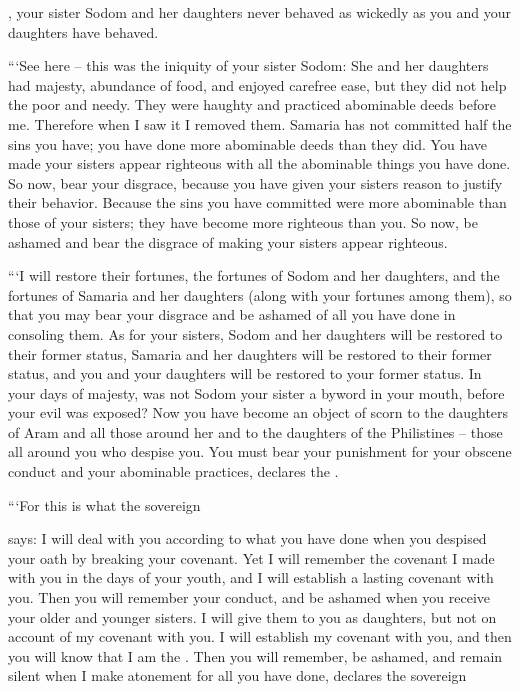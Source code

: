 {{}, your sister
Sodom
and her daughters
never behaved
as
wickedly as you
and your daughters
have
behaved.
\par }{\PP {}“‘See here – this was the iniquity of your sister Sodom: She and her daughters had majesty, abundance of food, and enjoyed carefree ease, but they did not help the poor and needy.
They were haughty
and practiced
abominable deeds
before
me. Therefore when I saw
it I removed them.
Samaria
has not
committed
half
the sins
you have; you have done more
abominable deeds
than they did. You have made your sisters
appear righteous
with all
the abominable things
you have
done.
So now,
bear
your disgrace,
because you
have
given your sisters
reason
to justify
their behavior. Because
the sins
you have committed were more abominable than
those of your sisters; they have become more
righteous than
you.
So
now, be ashamed
and bear
the disgrace
of making your sisters
appear righteous.
\par }{\PP {}“‘I will restore
their fortunes,
the fortunes
of Sodom
and her daughters,
and the fortunes
of Samaria
and her daughters
(along with your fortunes
among them),
so that you may
bear
your disgrace
and be ashamed
of all
you have
done
in consoling
them.
As for your sisters,
Sodom
and her daughters
will be restored
to their former status,
Samaria
and her daughters
will be restored
to their former status,
and you
and your daughters
will be restored
to your former status.
In your days
of majesty,
was not
Sodom
your sister
a byword
in your mouth,
before
your evil
was exposed? Now
you have become an object
of scorn
to the daughters
of Aram
and all
those around
her and to the daughters
of the
Philistines
– those all around
you who despise you.
You
must bear
your punishment for your obscene
conduct and your abominable practices,
declares
the {}.
\par }{\PP {}“‘For
this is what
the sovereign

{}
says: I will deal
with
you according to what
you have done
when
you despised
your oath
by breaking
your covenant.
Yet I
will remember
the
covenant
I made with
you in the days
of your youth,
and I will establish
a lasting
covenant with you.
Then you will remember
your conduct,
and be ashamed
when you receive
your older
and younger
sisters.
I will give
them
to you as daughters,
but not
on account of my covenant with you.
I
will establish
my covenant
with
you, and then you will know
that
I am
the {}.
Then
you will remember,
be ashamed,
and remain
silent
when I make atonement
for all
you have
done,
declares
the sovereign

}
